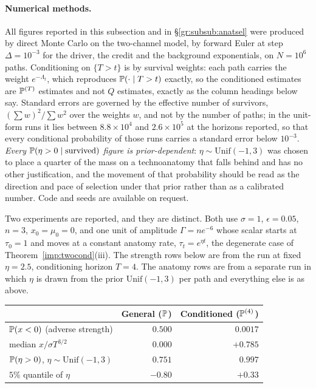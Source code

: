 \paragraph{Numerical methods.} All figures reported in this subsection and
in \S\ref{gr:subsub:anatsel} were produced by direct Monte Carlo on the
two-channel model, by forward Euler at step $\Delta=10^{-3}$ for the
driver, the credit and the background exponentials, on $N=10^{6}$ paths.
Conditioning on $\{T>t\}$ is by survival weights: each path carries the
weight $e^{-\Lambda_t}$, which reproduces $\mathbb{P}(\cdot\mid T>t)$ exactly, so
the conditioned estimates are $\mathbb{P}^{(T)}$ estimates and not $Q$ estimates,
exactly as the column headings below say. Standard errors are governed by
the effective number of survivors, $(\sum w)^2/\sum w^2$ over the weights
$w$, and not by the number of paths; in the unit-form runs it lies between
$8.8\times10^{4}$ and $2.6\times10^{5}$ at the horizons reported, so that
every conditional probability of those runs carries a standard error below
$10^{-3}$. \emph{Every $\mathbb{P}(\eta>0\mid\text{survived})$
figure is prior-dependent}: $\eta\sim\mathrm{Unif}(-1,3)$ was chosen to
place a quarter of the mass on a technoanatomy that falls behind and has
no other justification, and the movement of that probability should be
read as the direction and pace of selection under that prior rather than
as a calibrated number. Code and seeds are available on request.

Two experiments are reported, and they are distinct. Both use $\sigma=1$,
$\epsilon=0.05$, $n=3$, $x_0=\mu_0=0$, and one unit of amplitude
$\Gamma=ne^{-6}$ whose scalar starts at $\tau_0=1$ and moves at a constant
anatomy rate, $\tau_t=e^{\eta t}$, the degenerate case of
Theorem~\ref{imp:twocond}(iii). The strength rows below are from the run
at fixed $\eta=2.5$, conditioning horizon $T=4$. The anatomy rows are from
a separate run in which $\eta$ is drawn from the prior
$\mathrm{Unif}(-1,3)$ per path and everything else is as above.

\begin{center}\small
\begin{tabular}{@{}lrr@{}}
\toprule
& General ($\mathbb{P}$) & Conditioned ($\mathbb{P}^{(4)}$)\\
\midrule
$\mathbb{P}(x<0)$ (adverse strength) & $0.500$ & $0.0017$\\
median $x/\sigma T^{3/2}$ & $0.000$ & $+0.785$\\
$\mathbb{P}(\eta>0)$, $\eta\sim\mathrm{Unif}(-1,3)$ & $0.751$ & $0.997$\\
$5\%$ quantile of $\eta$ & $-0.80$ & $+0.33$\\
\bottomrule
\end{tabular}
\end{center}


